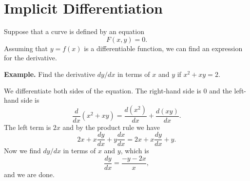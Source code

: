 \section*{Implicit Differentiation}

Suppose that a curve is defined by an equation
\[F(x, y) = 0.\]
Assuming that $y = f(x)$ is a differentiable function, we can find an expression for the derivative.

\textbf{Example.} Find the derivative $dy/dx$ in terms of $x$ and $y$ if $x^2 + xy = 2$.

We differentiate both sides of the equation. The right-hand side is $0$ and the left-hand side is
\[\frac{d}{dx} (x^2 + xy) = \frac{d(x^2)}{dx} + \frac{d(xy)}{dx}.\]
The left term is $2x$ and by the product rule we have
\[2x + x \frac{dy}{dx} + y \frac{dx}{dx} = 2x + x \frac{dy}{dx} + y.\]
Now we find $dy/dx$ in terms of $x$ and $y$, which is
\[\frac{dy}{dx} = \frac{-y - 2x}{x},\]
and we are done.
